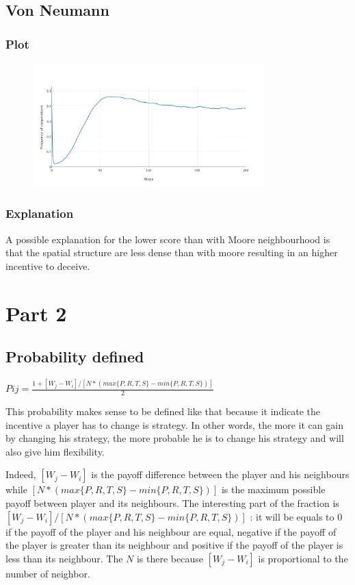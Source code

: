 \documentclass[11pt]{article}
\begin{document}
\subsection{Von Neumann}

\subsubsection{Plot}
\begin{figure}[H]
\centering
   \includegraphics[width=0.8\textwidth]{img/part1/cf-vonn-notmyselfincluded.png}
\end{figure}

\subsubsection{Explanation}
 
A possible explanation for the lower score than with Moore neighbourhood is that the spatial structure are less dense than with moore resulting in an higher incentive to deceive. 
 
\section{Part 2}

\subsection{Probability defined}

$Pij = \frac{1 + [W_j-W_i]/[N*(max\{P,R,T,S\} - min\{P,R,T,S\})]}{2}$ 

This probability makes sense to be defined like that because it indicate the incentive a player has to change is strategy. In other words, the more it can gain by changing his strategy, the more probable he is to change his strategy and will also give him flexibility. 

Indeed, $[W_j-W_i]$ is the payoff difference between the player and his neighbours while $ [N*(max\{P,R,T,S\} - min\{P,R,T,S\})]$ is the maximum possible payoff between player and its neighbours. The interesting part of the fraction is $[W_j-W_i]/[N*(max\{P,R,T,S\} - min\{P,R,T,S\})]$ : it will be equals to 0 if the payoff of the player and his neighbour are equal, negative if the payoff of the player is greater than its neighbour and positive if the payoff of the player is less than its neighbour. The $N$ is there because $[W_j-W_i]$ is proportional to the number of neighbor. 
\end{document}
